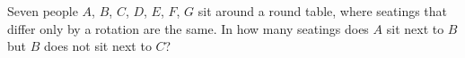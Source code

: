 Seven people $A$, $B$, $C$, $D$, $E$, $F$, $G$ sit around a round table, where seatings that differ only by a rotation are the same. In how many seatings does $A$ sit next to $B$ but $B$ does not sit next to $C$?

